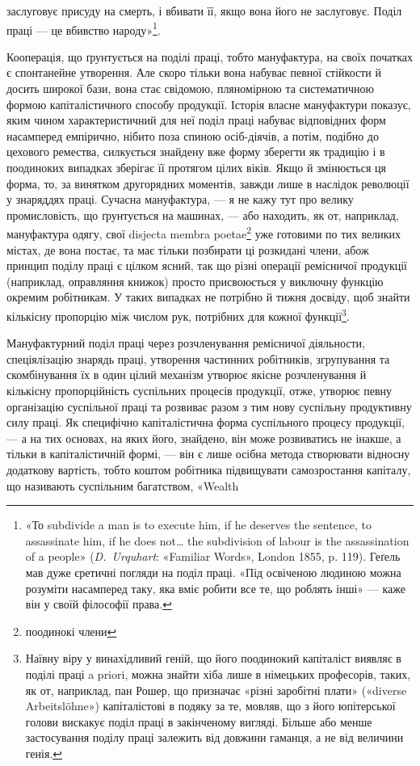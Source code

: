 \parcont{}  %
заслуговує присуду на смерть, і вбивати її, якщо вона його не
заслуговує. Поділ праці — це вбивство народу»\footnote{
«То subdivide a man is to execute him, if he deserves the sentence,
to assassinate him, if he does not\dots{} the subdivision of labour is the assassination
of a people» (\emph{D.~Urquhart}: «Familiar Words», London 1855,
p. 119). Геґель мав дуже єретичні погляди на поділ праці. «Під освіченою
людиною можна розуміти насамперед таку, яка вміє робити все
те, що роблять інші» — каже він у своїй філософії права.
}.

Кооперація, що ґрунтується на поділі праці, тобто мануфактура,
на своїх початках є спонтанейне утворення. Але скоро
тільки вона набуває певної стійкости й досить широкої бази,
вона стає свідомою, пляномірною та систематичною формою капіталістичного
способу продукції. Історія власне мануфактури
показує, яким чином характеристичний для неї поділ праці
набуває відповідних форм насамперед емпірично, нібито поза
спиною осіб-діячів, а потім, подібно до цехового ремества, силкується
знайдену вже форму зберегти як традицію і в поодиноких
випадках зберігає її протягом цілих віків. Якщо й змінюється
ця форма, то, за винятком другорядних моментів, завжди лише в
наслідок революції у знаряддях праці. Сучасна мануфактура, —
я не кажу тут про велику промисловість, що ґрунтується на
машинах, — або находить, як от, наприклад, мануфактура одягу,
свої disjecta membra poetae\footnote*{
поодинокі члени
} уже готовими по тих великих містах,
де вона постає, та має тільки позбирати ці розкидані члени,
абож принцип поділу праці є цілком ясний, так що різні
операції ремісничої продукції (наприклад, оправляння книжок)
просто присвоюється у виключну функцію окремим робітникам.
У таких випадках не потрібно й тижня досвіду, щоб знайти
кількісну пропорцію між числом рук, потрібних для кожної
функції\footnote{
Наївну віру у винахідливий геній, що його поодинокий капіталіст
виявляє в поділі праці a priori, можна знайти хіба лише в німецьких
професорів, таких, як от, наприклад, пан Рошер, що призначає «різні
заробітні плати» («diverse Arbeitslöhne») капіталістові в подяку за те,
мовляв, що з його юпітерської голови вискакує поділ праці в закінченому
вигляді. Більше або менше застосування поділу праці залежить від
довжини гаманця, а не від величини генія.
}.

Мануфактурний поділ праці через розчленування ремісничої
діяльности, спеціялізацію знарядь праці, утворення частинних
робітників, згрупування та скомбінування їх в один цілий механізм
утворює якісне розчленування й кількісну пропорційність
суспільних процесів продукції, отже, утворює певну організацію
суспільної праці та розвиває разом з тим нову суспільну продуктивну
силу праці. Як специфічно капіталістична форма суспільного
процесу продукції, — а на тих основах, на яких його,
знайдено, він може розвиватись не інакше, а тільки в капіталістичній
формі, — він є лише осібна метода створювати відносну додаткову
вартість, тобто коштом робітника підвищувати самозростання
капіталу, що називають суспільним багатством, «Wealth
\parbreak{}  %
